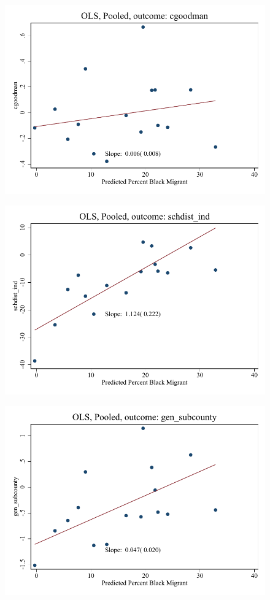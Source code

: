 \documentclass{article}
\begin{document}
\clearpage
\begin{figure}
	\centering
	\includegraphics[width=.8\textwidth]{figures/binscatter/pooled_cgoodman_ols_percent.pdf}
\end{figure}
\clearpage
\begin{figure}
	\centering
	\includegraphics[width=.8\textwidth]{figures/binscatter/pooled_schdist_ind_ols_percent.pdf}
\end{figure}
\clearpage
\begin{figure}
	\centering
	\includegraphics[width=.8\textwidth]{figures/binscatter/pooled_gen_subcounty_ols_percent.pdf}
\end{figure}
\end{document}

